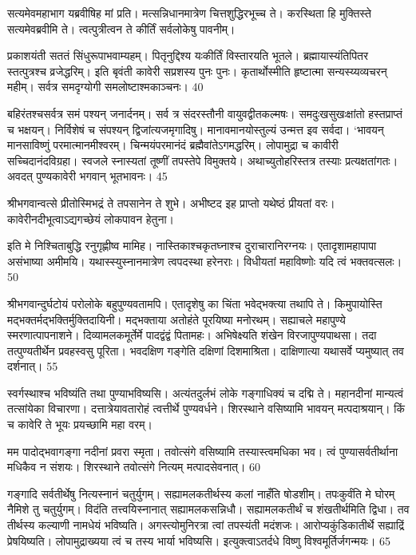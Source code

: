 सत्यमेवमहाभाग यब्रवीषिह मां प्रति।
मत्सन्निधानमात्रेण चित्तशुद्धिरभूच्च ते।
करस्थिता हि मुक्तिस्ते सत्यमेवब्रवीमि ते।
त्वत्पुत्रीत्वन ते कीर्तिं सर्वलोकेषु पावनीम्।

प्रकाशयंती सततं सिंधुरूपाभवाम्यहम्।
पितृनुद्दिश्य यःकीर्तिं विस्तारयति भूतले।
ब्रह्मायास्यंतिपितर स्तत्पुत्रश्च व्रजेद्धरिम्।
इति बृवंती कावेरी सप्रशस्य पुनः पुनः।
कृतार्थोस्मीति हृष्टात्मा सन्यस्य्यव्यचरन् महीम्।
सर्वत्र समदृग्योगी समलोष्टाश्मकाञ्चनः।
40

बहिरंतश्चसर्वत्र समं पश्यन् जनार्दनम्।
सर्व त्र संदरस्तौनी वायुवद्वीतकल्मषः।
समदुःखसुखःक्षांतो हस्तप्राप्तं च भक्षयन्।
निर्विशेषं च संपश्यन् द्विजांत्यजमृगादिषु।
मानावमानयोस्तुल्यं उन्मत्त इव सर्वदा।
‘भावयन् मानसाविष्णुं परमात्मानमीश्वरम्।
चिन्मयंपरमानंदं ब्रह्मैवांतेऽगमद्धरिम्।
लोपामुद्रा च कावीरी सच्चिदानंदविग्रहा।
स्वजले स्नास्यतां तूष्णीं तपस्तेपे विमुक्तये।
अथाच्युतोहरिस्तत्र तस्याः प्रत्यक्षतांगतः।
अवदत् पुण्यकावेरी भगवान् भूतभावनः।
45

श्रीभगवान्वत्से प्रीतोस्मिभद्रं ते तपसानेन ते शुभे।
अभीष्टद इह प्राप्तो यथेष्ठं प्रीयतां वरः।
कावेरीनदीभूत्वाऽद्यगच्छेयं लोकपावन हेतुना।

इति मे निश्चिताबुद्धि रनुगृह्णीष्व मामिह।
नास्तिकाश्चकृतघ्नाश्च दुराचारानिरग्नयः।
एतादृशामहापापा असंभाष्या अमीमयि।
यथास्स्युस्नानमात्रेण त्वपदस्था हरेनराः।
विधीयतां महाविष्णोः यदि त्वं भक्तवत्सलः।
50

श्रीभगवान्दुर्घटोयं परोलोके बहुपुण्यवतामपि।
एतादृशेषु का चिंता भवेद्भक्त्या तथापि ते।
किमुपायोस्ति मद्भक्तर्मद्भक्तिर्मुक्तिदायिनी।
मद्भक्ताया अतोहंते पूरयिष्या मनोरथम्।
सह्याचले महापुण्ये स्मरणात्पापनाशने।
दिव्यामलकमूर्तेर्मे पादद्वंद्वं पितामहः।
अभिषेक्ष्यति शंखेन विरजापुण्यपाथसा।
तदा तत्पुण्यतीर्थेन प्रवहस्वसु पूरिता।
भवदक्षिण गङ्गेति दक्षिणां दिशमाश्रिता।
दाक्षिणात्या यथासर्वे प्यमुष्यात् तव दर्शनात्।
55

स्वर्गस्थाश्च भविष्यंति तथा पुण्याभविष्यसि।
अत्यंतदुर्लभं लोके गङ्गाधिक्यं च दद्मि ते।
महानदीनां मान्यत्वं तत्सांयेका विचारणा।
दत्तात्रेयावतारोहं त्वत्तीर्थे पुण्यवर्धने।
शिरस्थाने वसिष्यामि भावयन् मत्पदाश्रयान्।
किं च कावेरि ते भूयः प्रयच्छामि महा वरम्।

मम पादोद्भवागङ्गा नदीनां प्रवरा स्मृता।
तवोत्संगे वसिष्यामि तस्यास्त्वमधिका भव।
त्वं पुण्यासर्वतीर्थाना मधिकैव न संशयः।
शिरस्थाने तवोत्संगे नित्यम् मत्पादसेवनात्।
60

गङ्गादि सर्वतीर्थेषु नित्यस्नानं चतुर्युगम्।
सह्यामलकतीर्थस्य कलां नाहँति षोडशीम्।
तपःकुर्वंति मे घोरम् नैमिशे तु चतुर्युगम्।
विदंति तत्त्वयिस्नानात् सह्यामलकसन्निधौ।
सह्यामलकतीर्थं च शंखतीर्थमिति द्विधा।
तव तीर्थस्य कल्याणी नामधेयं भविष्यति।
अगस्त्योमुनिरत्रा त्वां तपस्यंती मदंशजः।
आरोप्यकुंडिकातीर्थे सह्याद्रिं प्रेषयिष्यति।
लोपामुद्राख्यया त्वं च तस्य भार्या भविष्यसि।
इत्युक्त्वाऽतर्दधे विष्णु विश्वमूर्तिर्जगन्मयः।
65

